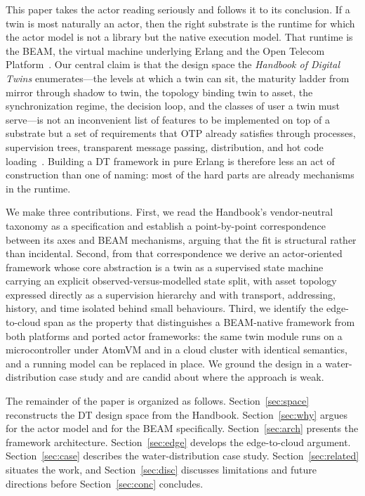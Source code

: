 \documentclass[conference]{IEEEtran}
\newcommand{\beam}{BEAM\xspace}
\newcommand{\otp}{OTP\xspace}
\newcommand{\dt}{DT\xspace}
\begin{document}
This paper takes the actor reading seriously and follows it to its conclusion.
If a twin is most naturally an actor, then the right substrate is the runtime
for which the actor model is not a library but the native execution model. That
runtime is the \beam, the virtual machine underlying Erlang and the Open
Telecom Platform~\cite{armstrong2003,cesarini2016}. Our central claim is that
the design space the \emph{Handbook of Digital Twins} enumerates---the levels
at which a twin can sit, the maturity ladder from mirror through shadow to
twin, the topology binding twin to asset, the synchronization regime, the
decision loop, and the classes of user a twin must serve---is not an
inconvenient list of features to be implemented on top of a substrate but a
set of requirements that \otp already satisfies through processes, supervision
trees, transparent message passing, distribution, and hot code
loading~\cite{handbook,hamzaoui2024,otpdesign}. Building a \dt framework in pure
Erlang is therefore less an act of construction than one of naming: most of the
hard parts are already mechanisms in the runtime.

We make three contributions. First, we read the Handbook's vendor-neutral
taxonomy as a specification and establish a point-by-point correspondence
between its axes and \beam mechanisms, arguing that the fit is structural rather
than incidental. Second, from that correspondence we derive an actor-oriented
framework whose core abstraction is a twin as a supervised state machine
carrying an explicit observed-versus-modelled state split, with asset topology
expressed directly as a supervision hierarchy and with transport, addressing,
history, and time isolated behind small behaviours. Third, we identify the
edge-to-cloud span as the property that distinguishes a \beam-native framework
from both platforms and ported actor frameworks: the same twin module runs on a
microcontroller under AtomVM and in a cloud cluster with identical semantics,
and a running model can be replaced in place. We ground the design in a
water-distribution case study and are candid about where the approach is weak.

The remainder of the paper is organized as follows. Section~\ref{sec:space}
reconstructs the \dt design space from the Handbook. Section~\ref{sec:why}
argues for the actor model and for the \beam specifically.
Section~\ref{sec:arch} presents the framework architecture.
Section~\ref{sec:edge} develops the edge-to-cloud argument.
Section~\ref{sec:case} describes the water-distribution case study.
Section~\ref{sec:related} situates the work, and Section~\ref{sec:disc}
discusses limitations and future directions before
Section~\ref{sec:conc} concludes.
\end{document}
